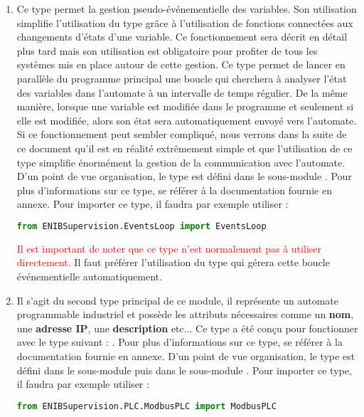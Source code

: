 \documentclass[12pt]{report}    %
\begin{document}
\begin{enumerate}
\item {} \newline
Ce type permet la gestion pseudo-événementielle des variables. Son utilisation simplifie l'utilisation du type  grâce à l'utilisation de fonctions connectées aux changements d'états d'une variable. Ce fonctionnement sera décrit en détail plus tard mais son utilisation est obligatoire pour profiter de tous les systèmes mis en place autour de cette gestion.\newline
Ce type permet de lancer en parallèle du programme principal une boucle qui cherchera à analyser l'état des variables dans l'automate à un intervalle de temps régulier. De la même manière, lorsque une variable est modifiée dans le programme et seulement si elle est modifiée, alors son état sera automatiquement envoyé vers l'automate. \newline
Si ce fonctionnement peut sembler compliqué, nous verrons dans la suite de ce document qu'il est en réalité extrêmement simple et que l'utilisation de ce type simplifie énormément la gestion de la communication avec l'automate. \newline
D'un point de vue organisation, le type  est défini dans le sous-module .\newline
Pour plus d'informations sur ce type, se référer à la documentation fournie en annexe.\newline
Pour importer ce type, il faudra par exemple utiliser :
\begin{lstlisting}[language=Python]
from ENIBSupervision.EventsLoop import EventsLoop
\end{lstlisting}
\textcolor{red}{Il est important de noter que ce type n'est normalement pas à utiliser directement}. Il faut préférer l'utilisation du type  qui gérera cette boucle événementielle automatiquement.

\item \label{tag-presentation-ModbusPLC}  \newline
Il s'agit du second type principal de ce module, il représente un automate programmable industriel et possède les attributs nécessaires comme un \textbf{nom}, une \textbf{adresse IP}, une \textbf{description} etc... Ce type a été conçu pour fonctionner avec le type suivant : .\newline
Pour plus d'informations sur ce type, se référer à la documentation fournie en annexe.\newline
D'un point de vue organisation, le type  est défini dans le sous-module  puis dans le sous-module . \newline
Pour importer ce type, il faudra par exemple utiliser :
\begin{lstlisting}[language=Python]
from ENIBSupervision.PLC.ModbusPLC import ModbusPLC
\end{lstlisting}

\end{enumerate}
\end{document}
